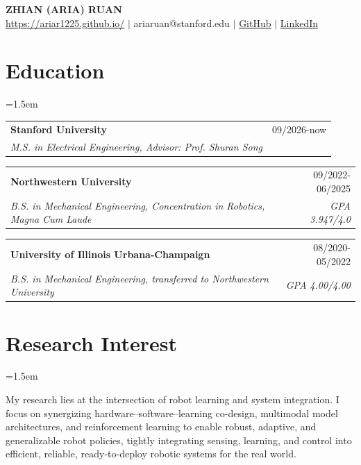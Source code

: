 \documentclass[10pt,letterpaper]{article}
\makeatletter
\newenvironment{block}{\begin{list}{}{\leftmargin=1.5em\rightmargin=0pt\itemsep=0pt\topsep=0pt}\item[]}{\end{list}}
\newcommand{\entry}[4]{%
  \begin{tabularx}{\linewidth}{@{}>{\raggedright\arraybackslash}X r@{}}
    \textbf{#1} & #2 \\
    \textit{#3} & \textit{#4}
  \end{tabularx}\par\vspace{0.3em}}
\makeatother
\begin{document}
\begin{center}
  {\bfseries\fontsize{24}{28}\selectfont ZHIAN (ARIA) RUAN}\\[0.6em]
  \href{https://ariar1225.github.io/}{https://ariar1225.github.io/} $|$ ariaruan@stanford.edu $|$
  \href{https://github.com/ariaR1225}{GitHub} $|$
  \href{https://www.linkedin.com/in/aria-ruan-11055a201/}{LinkedIn}
\end{center}

\section{Education}
\begin{block}
\entry{Stanford University}{09/2026-now}{M.S. in Electrical Engineering, Advisor: Prof. Shuran Song}{}
\entry{Northwestern University}{09/2022-06/2025}{B.S. in Mechanical Engineering, Concentration in Robotics, Magna Cum Laude}{GPA 3.947/4.0}
\entry{University of Illinois Urbana-Champaign}{08/2020-05/2022}{B.S. in Mechanical Engineering, transferred to Northwestern University}{GPA 4.00/4.00}
\end{block}

\section{Research Interest}
\begin{block}
My research lies at the intersection of robot learning and system integration. I focus on synergizing
hardware--software--learning co-design, multimodal model architectures, and reinforcement learning to
enable robust, adaptive, and generalizable robot policies, tightly integrating sensing, learning, and
control into efficient, reliable, ready-to-deploy robotic systems for the real world.
\end{block}
\end{document}
